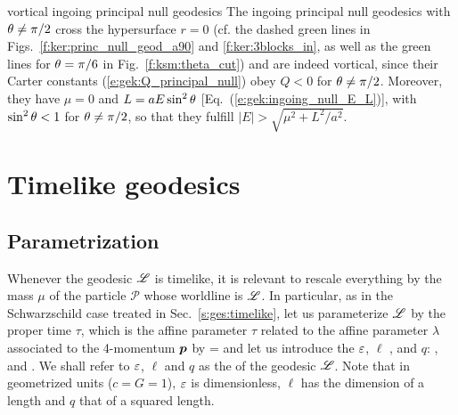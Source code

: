 \begin{texample}{vortical ingoing principal null geodesics}{}
The ingoing principal null geodesics with $\theta\neq \pi/2$ cross
the hypersurface $r=0$ (cf. the dashed green lines in Figs.~\ref{f:ker:princ_null_geod_a90}
and \ref{f:ker:3blocks_in}, as well as the green lines for $\theta=\pi/6$ in
Fig.~\ref{f:ksm:theta_cut}) and  are indeed vortical,
since their Carter constants (\ref{e:gek:Q_principal_null}) obey $Q<0$ for $\theta\neq \pi/2$.
Moreover, they have $\mu=0$ and $L = a E \sin^2\theta$ [Eq.~(\ref{e:gek:ingoing_null_E_L})],
with $\sin^2\theta < 1$ for $\theta\neq \pi/2$,
so that they fulfill $|E| > \sqrt{\mu^2 + L^2/a^2}$.
\end{texample}

\section{Timelike geodesics} \label{s:gek:timelike}

\subsection{Parametrization}

Whenever the geodesic $\mathscr{L}$ is timelike, it is relevant to
rescale everything by the mass $\mu$ of the particle $\mathscr{P}$ whose worldline is $\mathscr{L}$.
In particular, as in the Schwarzschild case treated in Sec.~\ref{s:ges:timelike},
let us parameterize $\mathscr{L}$ by the proper time $\tau$, which is the affine parameter
$\tau$ related to the affine parameter $\lambda$ associated to the 4-momentum $\bm{p}$
by
\be \label{e:gek:tau_mu_lamb}
    \tau = \mu \lambda
\ee
and let us introduce the
 $\varepsilon$,
$\ell$ ,
and  $q$:
\be \label{e:gek:def_eps_ell_mQ}
  , \qquad
   \qquad\mbox{and}\qquad
   .
\ee
We shall refer to $\varepsilon$, $\ell$ and $q$ as the
of the geodesic $\mathscr{L}$. Note that in geometrized units ($c=G=1$), $\varepsilon$ is
dimensionless, $\ell$ has the dimension of a length and $q$ that of a squared length.

